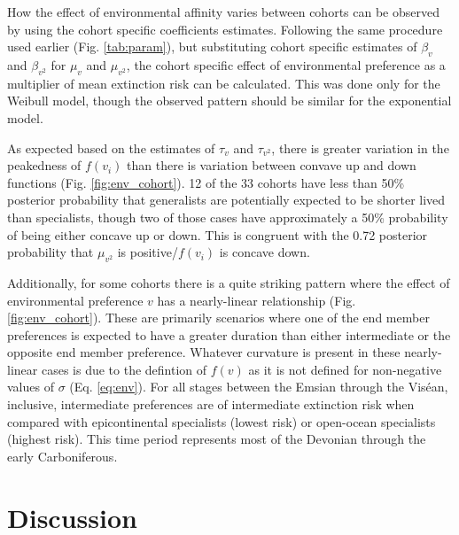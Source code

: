 \documentclass{article}
\begin{document}
How the effect of environmental affinity varies between cohorts can be observed by using the cohort specific coefficients estimates. Following the same procedure used earlier (Fig. \ref{tab:param}), but substituting cohort specific estimates of \(\beta_{v}\) and \(\beta_{v^{2}}\) for \(\mu_{v}\) and \(\mu_{v^{2}}\), the cohort specific effect of environmental preference as a multiplier of mean extinction risk can be calculated. This was done only for the Weibull model, though the observed pattern should be similar for the exponential model. 

As expected based on the estimates of \(\tau_{v}\) and \(\tau_{v^{2}}\), there is greater variation in the peakedness of \(f(v_{i})\) than there is variation between convave up and down functions (Fig. \ref{fig:env_cohort}). 12 of the 33 cohorts have less than 50\% posterior probability that generalists are potentially expected to be shorter lived than specialists, though two of those cases have approximately a 50\% probability of being either concave up or down. This is congruent with the 0.72 posterior probability that \(\mu_{v^{2}}\) is positive/\(f(v_{i})\) is concave down.


Additionally, for some cohorts there is a quite striking pattern where the effect of environmental preference \(v\) has a nearly-linear relationship (Fig. \ref{fig:env_cohort}). These are primarily scenarios where one of the end member preferences is expected to have a greater duration than either intermediate or the opposite end member preference. Whatever curvature is present in these nearly-linear cases is due to the defintion of \(f(v)\) as it is not defined for non-negative values of \(\sigma\) (Eq. \ref{eq:env}). For all stages between the Emsian through the Vis\'{e}an, inclusive, intermediate preferences are of intermediate extinction risk when compared with epicontinental specialists (lowest risk) or open-ocean specialists (highest risk). This time period represents most of the Devonian through the early Carboniferous.


\section{Discussion}
\end{document}
